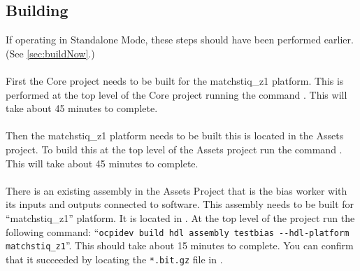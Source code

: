 \subsection{Building}
\label{sec:buildverify}
If operating in Standalone Mode, these steps should have been performed earlier. (See \ref{sec:buildNow}.)
\\ \\
First the Core project needs to be built for the matchstiq\_z1 platform.  This is performed at the top level of the Core project running the command .  This will take about  45 minutes to complete.    
\\ \\
Then the matchstiq\_z1 platform needs to be built this is located in the Assets project.  To build this at the top level of the Assets project run the command .  This will take about 45 minutes to complete.
\\ \\
There is an existing assembly in the Assets Project that is the bias worker with its inputs and outputs connected to software.  This assembly needs to be built for ``matchstiq\_z1'' platform. It is located in .  At the top level of the project run the following command: ``\texttt{ocpidev build hdl assembly testbias -\--hdl-platform matchstiq\_z1}''.  This should take about 15 minutes to complete. You can confirm that it succeeded by locating the \texttt{*.bit.gz} file in .\\

